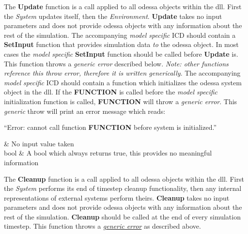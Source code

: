     \hspace{\parindent}\unclass The \textcolor{red5}{\textbf{Update}} function is a call applied to all \gls{odessa} objects within the \gls{dll}. First the \textit{System} updates itself, then the \textit{Environment}. \textcolor{red5}{\textbf{Update}} takes no input parameters and does not provide \gls{odessa} objects with any information about the rest of the simulation. The accompanying \textit{model specific} ICD should contain a \textcolor{red5}{\textbf{SetInput}} function that provides simulation data \textit{to} the \gls{odessa} object. In most cases the \textit{model specific} \textcolor{red5}{\textbf{SetInput}} function should be called before \textcolor{red5}{\textbf{Update}} is. This function throws a \textit{generic error} described below.
%    
    \hypertarget{genericerror}{\textit{Note: other functions reference this throw error, therefore it is written generically}.}
%
    The accompanying \textit{model specific} ICD should contain a function which initializes the \gls{odessa} system object in the \gls{dll}. If the \textcolor{red5}{\textbf{FUNCTION}} is called before the \textit{model specific} initialization function is called, \textcolor{red5}{\textbf{FUNCTION}} will throw a \textit{generic error}. This \textit{generic} throw will print an error message which reads: 
    
    ``Error: cannot call function \textcolor{red5}{\textbf{FUNCTION}} before system is initialized.''
%


    {
             & No input value taken\\ 
    }{
        bool & A bool which always returns true, this provides no meaningful information\\
    }
%
%

    \hspace{\parindent}\unclass The \textcolor{red5}{\textbf{Cleanup}} function is a call applied to all \gls{odessa} objects within the \gls{dll}. First the \textit{System} performs its end of timestep cleanup functionality, then any internal representations of external systems perform theirs. \textcolor{red5}{\textbf{Cleanup}} takes no input parameters and does not provide \gls{odessa} objects with any information about the rest of the simulation.\textcolor{red5}{\textbf{ Cleanup}} should be called at the end of every simulation timestep. This function throws a \hyperlink{genericerror}{\textit{generic error}} as described above.

